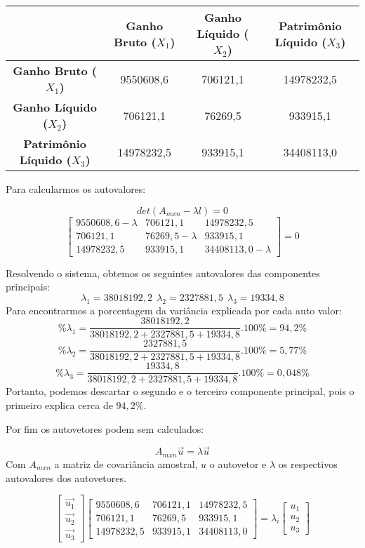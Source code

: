 \documentclass[
]{book}
\begin{document}
\begin{longtable}[]{@{}cccc@{}}
\toprule
& \textbf{Ganho Bruto (\(X_1\))} & \textbf{Ganho Líquido (\(X_2\))} & \textbf{Patrimônio Líquido (\(X_3\))}\tabularnewline
\midrule
\endhead
\textbf{Ganho Bruto (\(X_1\))} & 9550608,6 & 706121,1 & 14978232,5\tabularnewline
\textbf{Ganho Líquido (\(X_2\))} & 706121,1 & 76269,5 & 933915,1\tabularnewline
\textbf{Patrimônio Líquido (\(X_3\))} & 14978232,5 & 933915,1 & 34408113,0\tabularnewline
\bottomrule
\end{longtable}

Para calcularmos os autovalores:

\[det(A_{mxn}-\lambda l)=0\]
\[\begin{bmatrix}
9550608,6 -\lambda &706121,1 &14978232,5\\ 
706121,1 &76269,5-\lambda & 933915,1 \\
14978232,5&933915,1&34408113,0-\lambda
\end{bmatrix}=0\]

Resolvendo o sistema, obtemos os seguintes autovalores das componentes principais:
\[\lambda_1=38018192,2 \ \ \lambda_2=2327881,5 \ \ \lambda_3=19334,8\]
Para encontrarmos a porcentagem da variância explicada por cada auto valor:
\[\%\lambda_1=\frac{38018192,2}{38018192,2+2327881,5+19334,8}.100\%=94,2\% \] \[\%\lambda_2=\frac{2327881,5}{38018192,2+2327881,5+19334,8}.100\%=5,77\% \] \[\%\lambda_3=\frac{19334,8}{38018192,2+2327881,5+19334,8}.100\%=0,048\%\]
Portanto, podemos descartar o segundo e o terceiro componente principal, pois o primeiro explica cerca de \(94,2\%\).

Por fim os autovetores podem sem calculados:

\[A_{mxn}\vec{u}=\lambda \vec{u}\]
Com \(A_{mxn}\) a matriz de covariância amostral, \(u\) o autovetor e \(\lambda\) os respectivos autovalores dos autovetores.

\[\begin{bmatrix}
\vec{u_1}\\ \vec{u_2} \\ \vec{u_3}
\end{bmatrix}
\begin{bmatrix}
9550608,6  &706121,1 &14978232,5\\ 
706121,1 &76269,5 & 933915,1 \\
14978232,5&933915,1&34408113,0
\end{bmatrix}  = \lambda_i \begin{bmatrix}
u_1\\ u_2 \\ u_3
\end{bmatrix} \]
\end{document}
